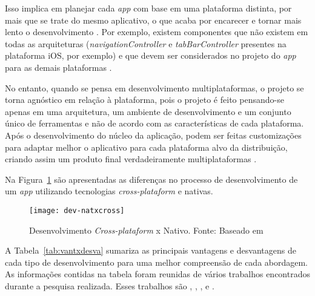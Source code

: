 Isso implica em planejar cada \textit{app} com base em uma plataforma distinta, por mais que se trate do mesmo aplicativo, o que acaba por encarecer 
e tornar mais lento o desenvolvimento \cite{kassas_taxonomy_2015}. Por exemplo, existem componentes que não existem em todas as arquiteturas (\textit{navigationController} e 
\textit{tabBarController} presentes na plataforma iOS, por exemplo) e que devem ser considerados no projeto do \textit{app} para as demais plataformas \cite{shakshuki_4th_2013}.

No entanto, quando se pensa em desenvolvimento multiplataformas, o projeto se torna agnóstico em relação à plataforma, pois o projeto é feito pensando-se 
apenas em uma arquitetura, um ambiente de desenvolvimento e um conjunto único de ferramentas e não de acordo com as características de cada plataforma. Após o desenvolvimento do núcleo da
aplicação, podem ser feitas customizações para adaptar melhor o aplicativo para cada plataforma alvo da distribuição, criando assim um produto final verdadeiramente multiplataformas \cite{corral_ant_2012}.

Na Figura~\ref{fig:dev-natxcross} são apresentadas as diferenças no processo de desenvolvimento de um \textit{app} utilizando tecnologias \textit{cross-plataform} e 
nativas.

\begin{figure}[H]
  \centering
    \texttt{[image: dev-natxcross]}
    \caption[Desenvolvimento \textit{Cross-plataform} x Nativo]{ Desenvolvimento \textit{Cross-plataform} x Nativo. Fonte: Baseado em \cite{corral_ant_2012}}
	\label{fig:dev-natxcross}
\end{figure}

A Tabela~\ref{tab:vantxdesva} sumariza as principais vantagens e desvantagens de cada tipo de desenvolvimento para uma melhor compreensão de cada abordagem. 
As informações contidas na tabela foram reunidas de vários trabalhos encontrados durante a pesquisa realizada. Esses trabalhos são , 
, ,  e . 

